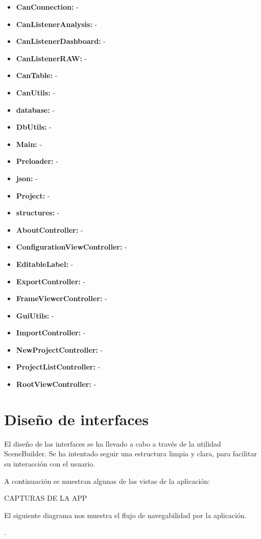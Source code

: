 \begin{itemize}
\item
\textbf{CanConnection:} -
\item
\textbf{CanListenerAnalysis:} -
\item
\textbf{CanListenerDashboard:} -
\item
\textbf{CanListenerRAW:} -
\item
\textbf{CanTable:} -
\item
\textbf{CanUtils:} -
\item
\textbf{database:} -
\item
\textbf{DbUtils:} -
\item
\textbf{Main:} -
\item
\textbf{Preloader:} -
\item
\textbf{json:} -
\item
\textbf{Project:} -
\item
\textbf{structures:} -
\item
\textbf{AboutController:} -
\item
\textbf{ConfigurationViewController:} -
\item
\textbf{EditableLabel:} -
\item
\textbf{ExportController:} -
\item
\textbf{FrameViewerController:} -
\item
\textbf{GuiUtils:} -
\item
\textbf{ImportController:} -
\item
\textbf{NewProjectController:} -
\item
\textbf{ProjectListController:} -
\item
\textbf{RootViewController:} -
\end{itemize}


\section{Diseño de interfaces}

El diseño de las interfaces se ha llevado a cabo a través de la utilidad SceneBuilder. Se ha intentado seguir una estructura limpia y clara, para facilitar su interacción con el usuario.

A continuación se muestran algunas de las vistas de la aplicación:

CAPTURAS DE LA APP

El siguiente diagrama nos muestra el flujo de navegabilidad por la aplicación.


.
